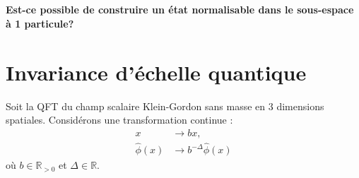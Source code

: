\documentclass{article}
\numberwithin{equation}{section}
\begin{document}
\subsection{}
\textbf{Est-ce possible de construire un état normalisable dans le sous-espace à 1 particule? 
}
\section{Invariance d'échelle quantique}
Soit la QFT du champ scalaire Klein-Gordon sans masse
en 3 dimensions spatiales. Considérons une transformation continue :
\begin{equation}
        \begin{split}
                x &\rightarrow bx, \\
                \hat{\phi}(x) &\rightarrow b^{-\Delta} \hat{\phi}(x)
        \end{split}
\end{equation} 
où $b \in \mathbb{R}_{>0}$ et $\Delta \in \mathbb{R}$.

\subsection{}
\end{document}
